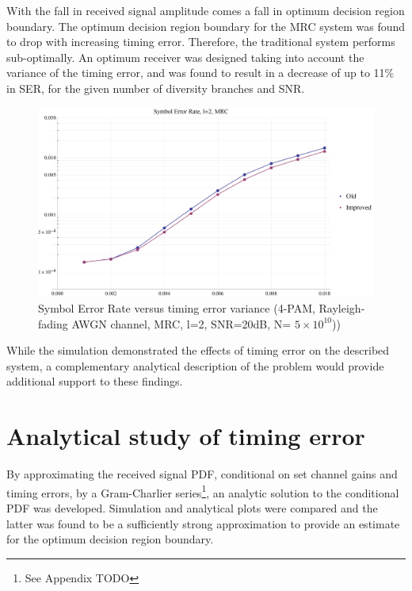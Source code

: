With the fall in received signal amplitude comes a fall in optimum decision region boundary. The optimum decision region boundary for the MRC system was found to drop with increasing timing error. Therefore, the traditional system performs sub-optimally. An optimum receiver was designed taking into account the variance of the timing error, and was found to result in a decrease of up to 11\% in SER, for the given number of diversity branches and SNR.

\begin{figure}[htbp]
\centering
\includegraphics[width=\linewidth]{MRC2_SER.png}
\caption[MRC Symbol Error Rate]{Symbol Error Rate versus timing error variance (4-PAM, Rayleigh-fading AWGN channel, MRC, l=2, SNR=20dB, N= $5 \times 10^{10}$))}
\end{figure}

While the simulation demonstrated the effects of timing error on the described system, a complementary analytical description of the problem would provide additional support to these findings.

\section{Analytical study of timing error}

By approximating the received signal PDF, conditional on set channel gains and timing errors, by a Gram-Charlier series\footnote{See Appendix TODO}, an analytic solution to the conditional PDF was developed. Simulation and analytical plots were compared and the latter was found to be a sufficiently strong approximation to provide an estimate for the optimum decision region boundary.

